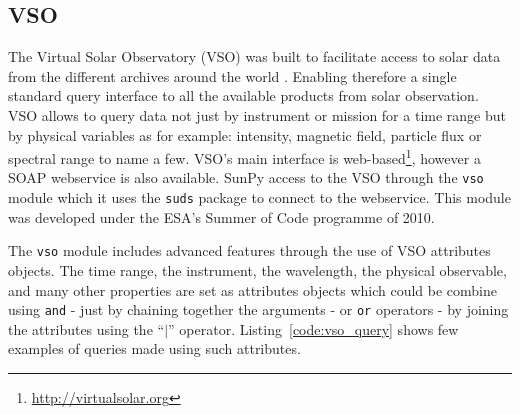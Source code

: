 \subsection{VSO}\label{ssec:vso}

The Virtual Solar Observatory (VSO) was built to facilitate
access to solar data from the different archives around the 
world \cite{hill_virtual_2009}.  
Enabling therefore a single standard query interface to all
the available products from solar observation.  
VSO allows to query data not just by instrument or mission for 
a time range but by physical variables as for example:
intensity, magnetic field, particle flux or spectral range to name a few.
VSO's main interface is web-based\footnote{\url{http://virtualsolar.org}}, 
however a SOAP webservice is also available.
SunPy access to the VSO through the \texttt{vso} module which it uses 
the \texttt{suds} package to connect to the webservice.
This module was developed under the ESA's Summer of Code programme of 2010.

The \texttt{vso} module includes advanced features through the use
of VSO attributes objects.  
The time range, the instrument, the wavelength, the physical observable,
and many other properties are set as attributes objects which could
be combine using \texttt{and} - just by chaining together the arguments -
or \texttt{or} operators - by joining the attributes using the ``$|$'' operator.
Listing~\ref{code:vso_query} shows few examples of queries made using
such attributes.

